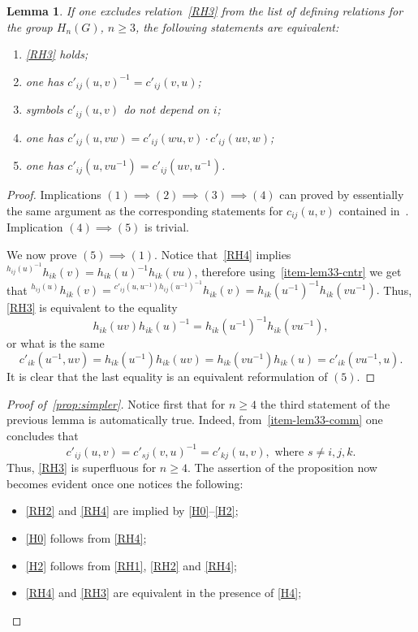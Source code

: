 \documentclass[oneside, 10pt]{amsart}
\theoremstyle{plain}
\numberwithin{equation}{section}
\newtheorem{lemma}{Lemma}
\numberwithin{lemma}{section}
\theoremstyle{remark}
\theoremstyle{definition}
\begin{document}
\begin{lemma}
If one excludes relation~\eqref{RH3} from the list of defining relations for the group $H_n(G)$, $n\geq 3$, the following statements are equivalent:
\begin{enumerate}
\item \label{item1} \eqref{RH3} holds;
\item \label{item2} one has $c'_{ij}(u, v)^{-1} = c'_{ij}(v, u)$;
\item \label{item3} symbols $c'_{ij}(u, v)$ do not depend on $i$;
\item \label{item4} one has $c'_{ij}(u, vw) = c'_{ij}(wu, v) \cdot c'_{ij}(uv, w)$;
\item \label{item5} one has $c'_{ij}(u, vu^{-1}) = c'_{ij}(uv, u^{-1})$.
\end{enumerate}
\end{lemma}
\begin{proof}
Implications $(1) \implies (2) \implies (3) \implies (4)$ can proved by essentially the same argument as 
 the corresponding statements for $c_{ij}(u, v)$ contained in~\cite[Lemmas~2.1-2.2]{Reh78}.
Implication $(4) \implies (5)$ is trivial.

We now prove $(5) \implies (1)$. Notice that~\eqref{RH4} implies ${}^{h_{ij}(u)^{-1}}h_{ik}(v) = h_{ik}(u)^{-1} h_{ik}(vu)$, therefore
using~\cref{item-lem33-cntr} we get that ${}^{h_{ij}(u)}h_{ik}(v) = {}^{c'_{ij}(u, u^{-1}) h_{ij}(u^{-1})^{-1}}h_{ik}(v) = h_{ik}(u^{-1})^{-1} h_{ik}(vu^{-1}).$
Thus, \eqref{RH3} is equivalent to the equality 
\[ h_{ik}(uv) h_{ik}(u)^{-1} = h_{ik}(u^{-1})^{-1} h_{ik}(vu^{-1}),\]
or what is the same
\[c'_{ik}(u^{-1}, uv) = h_{ik}(u^{-1}) h_{ik}(uv) =  h_{ik}(vu^{-1}) h_{ik}(u) = c'_{ik}(vu^{-1}, u).\]
It is clear that the last equality is an equivalent reformulation of $(5)$.
\end{proof}

\begin{proof}[Proof of~\cref{prop:simpler}]
Notice first that for $n\geq 4$ the third statement of the previous lemma is automatically true.
Indeed, from~\cref{item-lem33-comm} one concludes that
\[ c'_{ij}(u, v) = c'_{sj}(v, u)^{-1} = c'_{kj}(u, v), \text{ where } s\neq i,j,k. \]
Thus, \eqref{RH3} is superfluous for $n\geq 4$.
The assertion of the proposition now becomes evident once one notices the following:
\begin{itemize}
 \item \eqref{RH2} and \eqref{RH4} are implied by \eqref{H0}--\eqref{H2};
 \item \eqref{H0} follows from \eqref{RH4};
 \item \eqref{H2} follows from \eqref{RH1}, \eqref{RH2} and \eqref{RH4};
 \item \eqref{RH4} and \eqref{RH3} are equivalent in the presence of \eqref{H4}; 
\end{itemize}
\end{proof}
\end{document}

